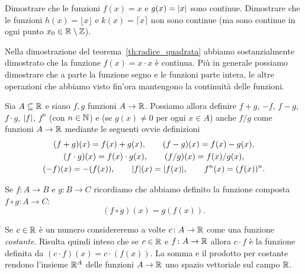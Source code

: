 \begin{exercise}
Dimostrare che le funzioni $f(x) = x$ e $g(x)={\left|x\right|}$ sono continue.
Dimostrare che le funzioni $h(x) = \lfloor x\rfloor$ e $k(x)=\lceil x \rceil$
non sono continue (ma sono continue in ogni punto
$x_0\in \mathbb R \setminus \mathbb Z$).
\end{exercise}

Nella dimostrazione del teorema~\ref{th:radice_quadrata}
abbiamo sostanzialmente dimostrato che la funzione
$f(x)=x\cdot x$ è continua.
Più in generale possiamo dimostrare che
a parte la funzione segno e le funzioni parte intera,
le altre operazioni che abbiamo visto fin'ora
mantengono la continuità delle funzioni.

\begin{definition}
Sia $A \subseteq \mathbb R$ e siano $f,g$ funzioni $A \to \mathbb R$.
Possiamo allora definire
$f+g$, $-f$, $f-g$, $f\cdot g$, ${\left|f\right|}$, $f^n$ (con $n\in \mathbb N$)
e (se $g(x)\neq 0$ per ogni $x\in A$) anche $f/g$
come funzioni $A \to \mathbb R$ mediante le seguenti ovvie
definizioni
\begin{gather*}
(f+g)(x) = f(x) + g(x), \qquad
(f-g)(x) = f(x) - g(x), \\
(f\cdot g)(x) = f(x) \cdot g(x), \qquad
(f/g)(x) = f(x) / g(x), \\
(-f)(x) = -(f(x)), \qquad
{\left|f\right|}(x) = {\left|f(x)\right|}, \qquad
f^n(x) = (f(x))^n.
\end{gather*}

Se $f\colon A \to B$ e $g\colon B\to C$ ricordiamo
che abbiamo definito la funzione composta
$f\circ g\colon A \to C$:
\[
  (f\circ g)(x) = g(f(x)).
\]

Se $c\in \mathbb R$ è un numero considereremo a volte $c\colon A \to \mathbb R$
come una funzione \emph{costante}.
Risulta quindi inteso che se $c\in \mathbb R$ e $f\colon A \to \mathbb R$
allora $c\cdot f$ è la funzione definita da
$(c\cdot f)(x) = c\cdot (f(x))$.
La somma e il prodotto per costante rendono l'insieme $\mathbb R^A$
delle funzioni $A \to \mathbb R$ uno spazio vettoriale sul campo $\mathbb R$.
\end{definition}

